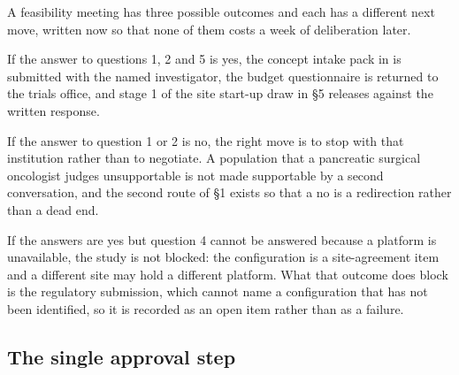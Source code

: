 A feasibility meeting has three possible outcomes and each has a different next
move, written now so that none of them costs a week of deliberation later.

If the answer to questions 1, 2 and 5 is yes, the concept intake pack in
 is submitted with the named
investigator, the budget questionnaire is returned to the trials office, and
stage 1 of the site start-up draw in \S5 releases against the written response.

If the answer to question 1 or 2 is no, the right move is to stop with that
institution rather than to negotiate. A population that a pancreatic surgical
oncologist judges unsupportable is not made supportable by a second conversation,
and the second route of \S1 exists so that a no is a redirection rather than a
dead end.

If the answers are yes but question 4 cannot be answered because a platform is
unavailable, the study is not blocked: the configuration is a site-agreement item
and a different site may hold a different platform. What that outcome does block
is the regulatory submission, which cannot name a configuration that has not been
identified, so it is recorded as an open item rather than as a failure.

\subsection{The single approval step}

